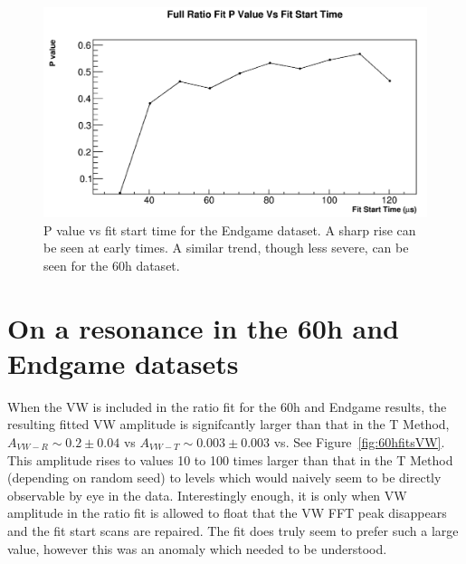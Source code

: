 \documentclass[12pt,letterpaper]{article}
\newcommand{\figref}[1]{Figure~\ref{#1}}
\begin{document}
\begin{figure}[]
    \centering
    \includegraphics[width=.7\textwidth]{Pvalue_Endgame}
    \caption[]{P value vs fit start time for the Endgame dataset. A sharp rise can be seen at early times. A similar trend, though less severe, can be seen for the 60h dataset.}
    \label{fig:Pvalue_Endgame}
\end{figure}

\clearpage

\section{On a resonance in the 60h and Endgame datasets}

When the VW is included in the ratio fit for the 60h and Endgame results, the resulting fitted VW amplitude is signifcantly larger than that in the T Method, $A_{VW-R} \sim 0.2 \pm 0.04$ vs $A_{VW-T} \sim 0.003 \pm 0.003$ vs. See \figref{fig:60hfitsVW}. This amplitude rises to values 10 to 100 times larger than that in the T Method (depending on random seed) to levels which would naively seem to be directly observable by eye in the data. Interestingly enough, it is only when VW amplitude in the ratio fit is allowed to float that the VW FFT peak disappears and the fit start scans are repaired. The fit does truly seem to prefer such a large value, however this was an anomaly which needed to be understood.
\end{document}

